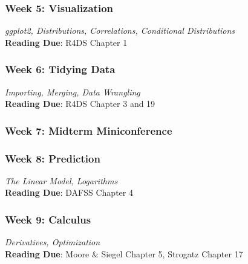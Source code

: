 \documentclass[11pt, letterpaper]{article}
\begin{document}
\subsubsection*{Week 5: Visualization}
\textit{ggplot2, Distributions, Correlations, Conditional Distributions}\\
\textbf{Reading Due}: R4DS Chapter 1

\subsubsection*{Week 6: Tidying Data}
\textit{Importing, Merging, Data Wrangling}\\
\textbf{Reading Due}: R4DS Chapter 3 and 19

\subsubsection*{Week 7: Midterm Miniconference}

\subsubsection*{Week 8: Prediction}
\textit{The Linear Model, Logarithms}\\
\textbf{Reading Due}: DAFSS Chapter 4

\subsubsection*{Week 9: Calculus}
\textit{Derivatives, Optimization}\\
\textbf{Reading Due}: Moore \& Siegel Chapter 5, Strogatz Chapter 17



\end{document}
